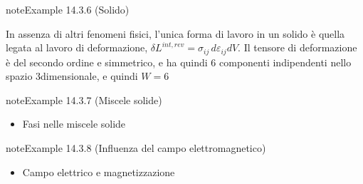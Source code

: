 \documentclass[letterpaper,10pt,italian]{jupyterBook}
\begin{document}
\label{ch/thermodynamics/principles-gibbs-phase-rule:example-9}
\begin{sphinxadmonition}{note}{Example 14.3.6 (Solido)}



\sphinxAtStartPar
In assenza di altri fenomeni fisici, l’unica forma di lavoro in un solido è quella legata al lavoro di deformazione, \(\delta L^{int,rev} = \sigma_{ij} \, d \varepsilon_{ij} dV\). Il tensore di deformazione è del secondo ordine e simmetrico, e ha quindi 6 componenti indipendenti nello spazio 3\sphinxhyphen{}dimensionale, e quindi \(W=6\)
\end{sphinxadmonition}
\label{ch/thermodynamics/principles-gibbs-phase-rule:example-10}
\begin{sphinxadmonition}{note}{Example 14.3.7 (Miscele solide)}


\begin{itemize}
\item {} 
\sphinxAtStartPar
Fasi nelle miscele solide 

\end{itemize}
\end{sphinxadmonition}
\label{ch/thermodynamics/principles-gibbs-phase-rule:example-11}
\begin{sphinxadmonition}{note}{Example 14.3.8 (Influenza del campo elettromagnetico)}


\begin{itemize}
\item {} 
\sphinxAtStartPar
Campo elettrico e magnetizzazione 

\end{itemize}
\end{sphinxadmonition}
\end{document}
